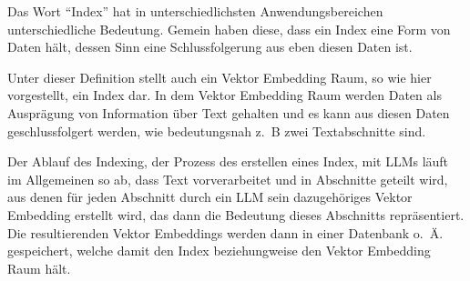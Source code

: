 \documentclass[../main.tex]{subfiles}
\begin{document}
Das Wort \enquote{Index} hat in unterschiedlichsten Anwendungsbereichen unterschiedliche Bedeutung.
Gemein haben diese, dass ein Index eine Form von Daten hält, dessen Sinn eine Schlussfolgerung aus eben diesen Daten ist.
\cite{Chatterjee2017Index,Lo2016What,Vickery1950THE}

Unter dieser Definition stellt auch ein Vektor Embedding Raum, so wie hier vorgestellt, ein Index dar.
In dem Vektor Embedding Raum werden Daten als Ausprägung von Information über Text gehalten und es kann aus diesen Daten geschlussfolgert werden, wie bedeutungsnah z. B zwei Textabschnitte sind.

Der Ablauf des Indexing, der Prozess des erstellen eines Index, mit \glspl{LLM} läuft im Allgemeinen so ab, dass Text vorverarbeitet und in Abschnitte geteilt wird, aus denen für jeden Abschnitt durch ein \gls{LLM} sein  dazugehöriges Vektor Embedding erstellt wird, das dann die Bedeutung dieses Abschnitts repräsentiert.
Die resultierenden Vektor Embeddings werden dann in einer Datenbank o. Ä. gespeichert, welche damit den Index beziehungweise den Vektor Embedding Raum hält.
\cite{ji2022speeding}
\end{document}

